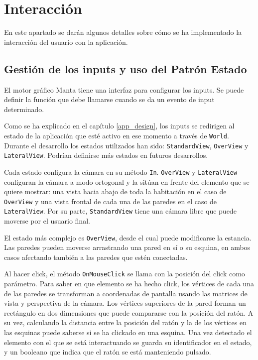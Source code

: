 \section{Interacción}
En este apartado se darán algunos detalles sobre cómo se ha implementado la interacción del usuario con la aplicación.

\subsection{Gestión de los inputs y uso del Patrón Estado}
El motor gráfico Manta tiene una interfaz para configurar los inputs. Se puede definir la función que debe llamarse cuando se da un evento de input determinado.

Como se ha explicado en el capítulo \ref{app_design}, los inputs se redirigen al estado de la aplicación que esté activo en ese momento a través de \texttt{World}. Durante el desarrollo los estados utilizados han sido: \texttt{StandardView}, \texttt{OverView} y \texttt{LateralView}. Podrían definirse más estados en futuros desarrollos.

Cada estado configura la cámara en su método \texttt{In}. \texttt{OverView} y \texttt{LateralView} configuran la cámara a modo ortogonal y la sitúan en frente del elemento que se quiere mostrar: una vista hacia abajo de toda la habitación en el caso de \texttt{OverView} y una vista frontal de cada una de las paredes en el caso de \texttt{LateralView}. Por su parte, \texttt{StandardView} tiene una cámara libre que puede moverse por el usuario final.

El estado más complejo es \texttt{OverView}, desde el cual puede modificarse la estancia. Las paredes pueden moverse arrastrando una pared en sí o su esquina, en ambos casos afectando también a las paredes que estén conectadas.

Al hacer click, el método \texttt{OnMouseClick} se llama con la posición del click como parámetro. Para saber en que elemento se ha hecho click, los vértices de cada una de las paredes se transforman a coordenadas de pantalla usando las matrices de vista y perspectiva de la cámara. Los vértices superiores de la pared forman un rectángulo en dos dimensiones que puede compararse con la posición del ratón. A su vez, calculando la distancia entre la posición del ratón y la de los vértices en las esquinas puede saberse si se ha clickado en una esquina. Una vez detectado el elemento con el que se está interactuando se guarda su identificador en el estado, y un booleano que indica que el ratón se está manteniendo pulsado.


